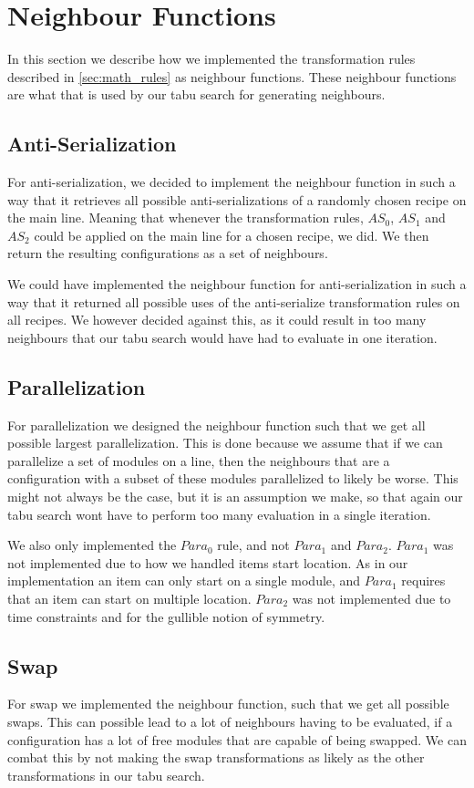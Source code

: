 \section{Neighbour Functions}
In this section we describe how we implemented the transformation rules described in \cref{sec:math_rules} as neighbour functions. These neighbour functions are what that is used by our tabu search for generating neighbours.


\subsection{Anti-Serialization}
For anti-serialization, we decided to implement the neighbour function in such a way that it retrieves all possible anti-serializations of a randomly chosen recipe on the main line. Meaning that whenever the transformation rules, $AS_0$, $AS_1$ and $AS_2$ could be applied on the main line for a chosen recipe, we did. We then return the resulting configurations as a set of neighbours.

We could have implemented the neighbour function for anti-serialization in such a way that it returned all possible uses of the anti-serialize transformation rules on all recipes. We however decided against this, as it could result in too many neighbours that our tabu search would have had to evaluate in one iteration.


\subsection{Parallelization}
For parallelization we designed the neighbour function such that we get all possible largest parallelization. This is done because we assume that if we can parallelize a set of modules on a line, then the neighbours that are a configuration with a subset of these modules parallelized to likely be worse. This might not always be the case, but it is an assumption we make, so that again our tabu search wont have to perform too many evaluation in a single iteration. 

We also only implemented the $Para_0$ rule, and not $Para_1$ and $Para_2$. $Para_1$ was not implemented due to how we handled items start location. As in our implementation an item can only start on a single module, and $Para_1$ requires that an item can start on multiple location. $Para_2$ was not implemented due to time constraints and for the gullible notion of symmetry.


\subsection{Swap}
For swap we implemented the neighbour function, such that we get all possible swaps. This can possible lead to a lot of neighbours having to be evaluated, if a configuration has a lot of free modules that are capable of being swapped. We can combat this by not making the swap transformations as likely as the other transformations in our tabu search.

